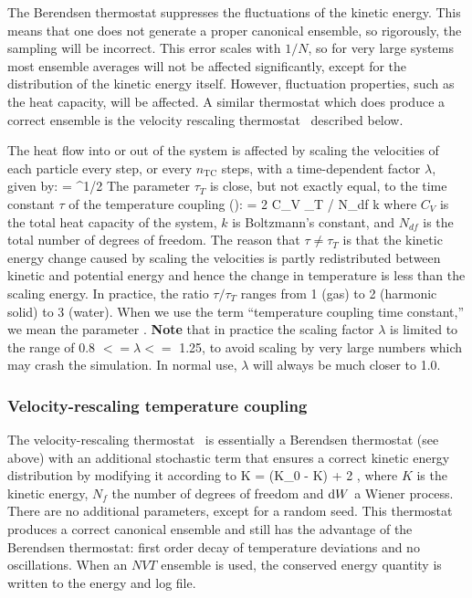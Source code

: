The Berendsen thermostat suppresses the fluctuations of the kinetic
energy.  This means that one does not generate a proper canonical
ensemble, so rigorously, the sampling will be incorrect.  This
error scales with $1/N$, so for very large systems most ensemble
averages will not be affected significantly, except for the
distribution of the kinetic energy itself.  However, fluctuation
properties, such as the heat capacity, will be affected.  A similar
thermostat which does produce a correct ensemble is the velocity
rescaling thermostat~\cite{Bussi2007a} described below.

The heat flow into or out of the system is affected by scaling the
velocities of each particle every step, or every $n_\mathrm{TC}$ steps,
with a time-dependent factor $\lambda$, given by:
\beq 
\lambda = ^{1/2}
\label{eqn:lambda}
\eeq
The parameter $\tau_T$ is close, but not exactly equal, to the time constant
$\tau$ of the temperature coupling ():
\beq
\tau = 2 C_V \tau_T / N_{df} k
\eeq
where $C_V$ is the total heat capacity of the system, $k$ is Boltzmann's
constant, and $N_{df}$ is the total number of degrees of freedom. The
reason that $\tau \neq \tau_T$ is that the kinetic energy change
caused by scaling the velocities is partly redistributed between
kinetic and potential energy and hence the change in temperature is
less than the scaling energy.  In practice, the ratio $\tau / \tau_T$
ranges from 1 (gas) to 2 (harmonic solid) to 3 (water). When we use
the term ``temperature coupling time constant,'' we mean the parameter
.  
{\bf Note} that in practice the scaling factor $\lambda$ is limited to 
the range of 0.8 $<= \lambda <=$ 1.25, to avoid scaling by very large
numbers which may crash the simulation. In normal use, 
$\lambda$ will always be much closer to 1.0.

\subsubsection{Velocity-rescaling temperature coupling}
The velocity-rescaling thermostat~\cite{Bussi2007a} is essentially a Berendsen
thermostat (see above) with an additional stochastic term that ensures
a correct kinetic energy distribution by modifying it according to
\beq
\de K = (K_0 - K)  + 2  ,
\label{eqn:vrescale}
\eeq
where $K$ is the kinetic energy, $N_f$ the number of degrees of freedom and $\de W$ a Wiener process.
There are no additional parameters, except for a random seed.
This thermostat produces a correct canonical ensemble and still has
the advantage of the Berendsen thermostat: first order decay of
temperature deviations and no oscillations.
When an $NVT$ ensemble is used, the conserved energy quantity
is written to the energy and log file.  

